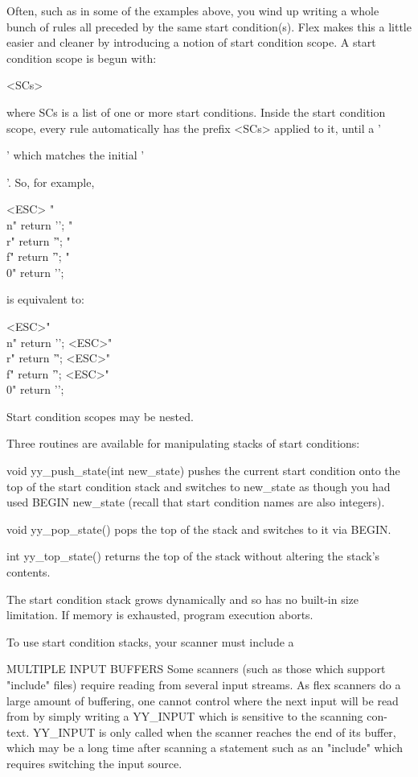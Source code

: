\documentclass[12pt,spanish,twocolumn,lettersize]{article}
\begin{document}
       Often,  such as in some of the examples above, you wind up
       writing a whole bunch of rules all preceded  by	the  same
       start  condition(s).   Flex makes this a little easier and
       cleaner by introducing a notion of start condition  scope.
       A start condition scope is begun with:

	   <SCs>{

       where  SCs  is  a  list	of  one or more start conditions.
       Inside the start condition scope, every rule automatically
       has  the	 prefix	 <SCs>	applied	 to it, until a '}' which
       matches the initial '{'.	 So, for example,

	   <ESC>{
	       "\\n"   return '\n';
	       "\\r"   return '\r';
	       "\\f"   return '\f';
	       "\\0"   return '\0';
	   }

       is equivalent to:

	   <ESC>"\\n"  return '\n';
	   <ESC>"\\r"  return '\r';
	   <ESC>"\\f"  return '\f';
	   <ESC>"\\0"  return '\0';

       Start condition scopes may be nested.

       Three routines are available for	 manipulating  stacks  of
       start conditions:

       void yy_push_state(int new_state)
	      pushes  the current start condition onto the top of
	      the start condition stack and switches to new_state
	      as though you had used BEGIN new_state (recall that
	      start condition names are also integers).

       void yy_pop_state()
	      pops the top of the stack and switches  to  it  via
	      BEGIN.

       int yy_top_state()
	      returns  the  top of the stack without altering the
	      stack's contents.

       The start condition stack grows dynamically and so has  no
       built-in size limitation.  If memory is exhausted, program
       execution aborts.

       To use start condition stacks, your scanner must include a

MULTIPLE INPUT BUFFERS
       Some  scanners  (such  as  those	 which	support "include"
       files) require reading from  several  input  streams.   As
       flex  scanners  do a large amount of buffering, one cannot
       control where the next input will be read from  by  simply
       writing a YY_INPUT which is sensitive to the scanning con-
       text.  YY_INPUT is only called when  the	 scanner  reaches
       the  end	 of  its  buffer,  which may be a long time after
       scanning a statement such as an "include"  which	 requires
       switching the input source.

}
\end{document}
